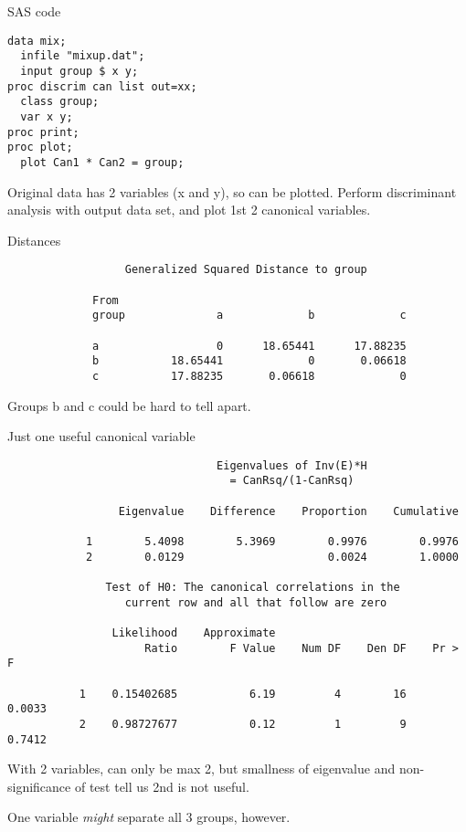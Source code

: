 \documentclass[pdf]{prosper}
\begin{document}
\begin{slide}{SAS code}

\begin{verbatim}
data mix;
  infile "mixup.dat";
  input group $ x y;
proc discrim can list out=xx;
  class group;
  var x y;
proc print;
proc plot;
  plot Can1 * Can2 = group;

\end{verbatim}

Original data has 2 variables (x and y), so can be plotted. Perform discriminant analysis with output data set, and plot 1st 2 canonical variables.
  
\end{slide}

\begin{slide}{Distances}

{\scriptsize
\begin{verbatim}
                  Generalized Squared Distance to group
 
             From
             group              a             b             c

             a                  0      18.65441      17.88235
             b           18.65441             0       0.06618
             c           17.88235       0.06618             0
\end{verbatim}
}

Groups b and c could be hard to tell apart.
  
\end{slide}

\begin{slide}{Just one useful canonical variable}

{\scriptsize
\begin{verbatim}
                                Eigenvalues of Inv(E)*H
                                  = CanRsq/(1-CanRsq)
 
                 Eigenvalue    Difference    Proportion    Cumulative

            1        5.4098        5.3969        0.9976        0.9976
            2        0.0129                      0.0024        1.0000

               Test of H0: The canonical correlations in the
                  current row and all that follow are zero
 
                Likelihood    Approximate
                     Ratio        F Value    Num DF    Den DF    Pr > F

           1    0.15402685           6.19         4        16    0.0033
           2    0.98727677           0.12         1         9    0.7412

\end{verbatim}
}
With 2 variables, can only be max 2, but smallness of eigenvalue and non-significance of test tell us 2nd is not useful.

\vspace{3ex}

One variable {\em might} separate all 3 groups, however.
  
\end{slide}
\end{document}
